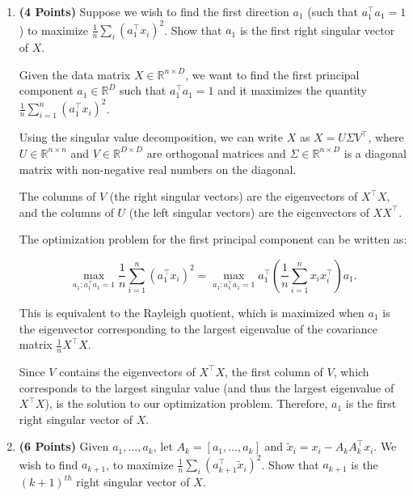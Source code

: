 \documentclass[a4paper]{article}
\theoremstyle{definition}
\newenvironment{soln}{
    \leavevmode\color{blue}\ignorespaces
}{}
\begin{document}
\begin{enumerate}

\item  \textbf{(4 Points)}
Suppose we wish to find the first direction $a_1$ (such that $a_1^\top a_1 = 1$) to maximize $\frac{1}{n} \sum_i (a_1^\top x_i)^2$.
Show that $a_1$ is the first right singular vector of $X$.

\begin{soln}
Given the data matrix $X \in \mathbb{R}^{n \times D}$, we want to find the first principal component $a_1 \in \mathbb{R}^D$ such that $a_1^\top a_1 = 1$ and it maximizes the quantity $\frac{1}{n} \sum_{i=1}^n (a_1^\top x_i)^2$.

Using the singular value decomposition, we can write $X$ as $X = U\Sigma V^\top$, where $U \in \mathbb{R}^{n \times n}$ and $V \in \mathbb{R}^{D \times D}$ are orthogonal matrices and $\Sigma \in \mathbb{R}^{n \times D}$ is a diagonal matrix with non-negative real numbers on the diagonal.
  
The columns of $V$ (the right singular vectors) are the eigenvectors of $X^\top X$, and the columns of $U$ (the left singular vectors) are the eigenvectors of $XX^\top$.
  
The optimization problem for the first principal component can be written as:
  
  \begin{equation}
  \max_{a_1: a_1^\top a_1 = 1} \frac{1}{n} \sum_{i=1}^n (a_1^\top x_i)^2 = \max_{a_1: a_1^\top a_1 = 1} a_1^\top \left(\frac{1}{n} \sum_{i=1}^n x_i x_i^\top \right) a_1.
  \end{equation}
  
This is equivalent to the Rayleigh quotient, which is maximized when $a_1$ is the eigenvector corresponding to the largest eigenvalue of the covariance matrix $\frac{1}{n}X^\top X$.
  
Since $V$ contains the eigenvectors of $X^\top X$, the first column of $V$, which corresponds to the largest singular value (and thus the largest eigenvalue of $X^\top X$), is the solution to our optimization problem. Therefore, $a_1$ is the first right singular vector of $X$.
\end{soln}

\item  \textbf{(6 Points)}
Given $a_1, \dots, a_k$, let $A_k = [a_1, \dots, a_k]$ and 
$\tilde{x}_i = x_i - A_kA_k^\top x_i$. We wish to find $a_{k+1}$, to maximize
$\frac{1}{n} \sum_i (a_{k+1}^\top \tilde{x}_i)^2$. Show that $a_{k+1}$ is the
$(k+1)^{th}$ right singular vector of $X$.


\end{enumerate}
\end{document}
